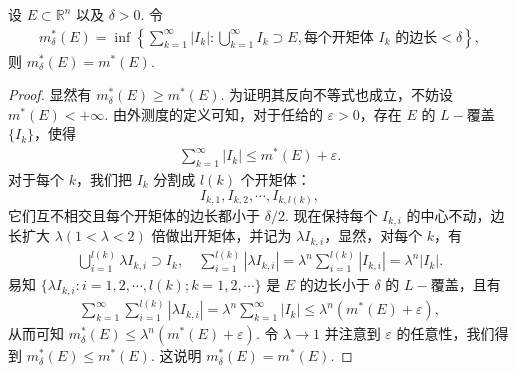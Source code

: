 \documentclass[../../main.tex]{subfiles}
\begin{document}
\begin{lemma}
设 \(E \subset \mathbb{R}^n\) 以及 \(\delta > 0\). 令
\begin{align*}
m^*_{\delta}(E) = \inf\left\{ \sum_{k = 1}^{\infty} |I_k| : \bigcup_{k = 1}^{\infty} I_k \supset E, \text{每个开矩体 } I_k \text{ 的边长} < \delta \right\},
\end{align*}
则 \(m^*_{\delta}(E)=m^*(E)\).
\end{lemma}
\begin{proof}
显然有 \(m^*_{\delta}(E) \geq m^*(E)\). 为证明其反向不等式也成立，不妨设 \(m^*(E)< + \infty\). 由外测度的定义可知，对于任给的 \(\varepsilon > 0\)，存在 \(E\) 的 \(L -\)覆盖 \(\{I_k\}\)，使得
\begin{align*}
\sum_{k = 1}^{\infty} |I_k| \leq m^*(E) + \varepsilon.
\end{align*}
对于每个 \(k\)，我们把 \(I_k\) 分割成 \(l(k)\) 个开矩体：
\[
I_{k,1}, I_{k,2}, \cdots, I_{k,l(k)},
\]
它们互不相交且每个开矩体的边长都小于 \(\delta/2\). 现在保持每个 \(I_{k,i}\) 的中心不动，边长扩大 \(\lambda(1 < \lambda < 2)\) 倍做出开矩体，并记为 \(\lambda I_{k,i}\)，显然，对每个 \(k\)，有
\begin{align*}
\bigcup_{i = 1}^{l(k)} \lambda I_{k,i} \supset I_k, \quad \sum_{i = 1}^{l(k)} |\lambda I_{k,i}| = \lambda^n \sum_{i = 1}^{l(k)} |I_{k,i}| = \lambda^n |I_k|.
\end{align*}
易知 \(\{\lambda I_{k,i} : i = 1,2,\cdots, l(k); k = 1,2,\cdots\}\) 是 \(E\) 的边长小于 \(\delta\) 的 \(L -\)覆盖，且有
\begin{align*}
\sum_{k = 1}^{\infty} \sum_{i = 1}^{l(k)} |\lambda I_{k,i}| = \lambda^n \sum_{k = 1}^{\infty} |I_k| \leq \lambda^n (m^*(E) + \varepsilon),
\end{align*}
从而可知 \(m^*_{\delta}(E) \leq \lambda^n (m^*(E) + \varepsilon)\). 令 \(\lambda \to 1\) 并注意到 \(\varepsilon\) 的任意性，我们得到 \(m^*_{\delta}(E) \leq m^*(E)\). 这说明 \(m^*_{\delta}(E)=m^*(E)\).
\end{proof}
\end{document}
